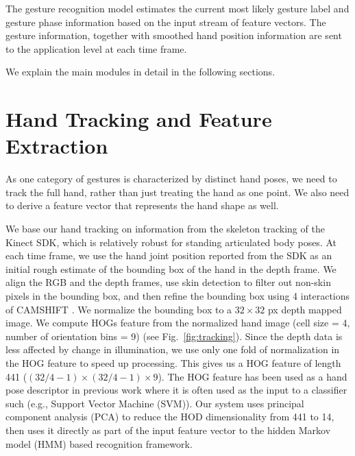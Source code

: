 \documentclass[conference]{IEEEtran}
\begin{document}
The gesture recognition model estimates the current most likely gesture label
and gesture phase information based on the input stream of
feature vectors. The gesture information, 
together with smoothed hand position information are sent to the application level at each time frame.

We explain the main modules in detail in the following sections.

\section{Hand Tracking and Feature Extraction}
As one category of gestures is characterized by distinct hand poses,
we need to track the full hand, rather than just treating the hand as one point. We
also need to derive a feature vector that represents the hand shape as well.

We base our hand tracking on information from the skeleton tracking of the
Kinect SDK, which is relatively robust for standing articulated body poses. At
each time frame, we use the hand joint position reported from the SDK as an
initial rough estimate of the bounding box of the hand in the depth frame.
We align the RGB and the depth frames, use skin detection to filter out
non-skin pixels in the bounding box, and then refine the bounding box using 4
interactions of CAMSHIFT \cite{bradski98}. We normalize the bounding box to a $32\times 32$ px depth
mapped image. We compute HOGs
feature from the normalized hand image (cell size =
4, number of orientation bins = 9) (see Fig.~\ref{fig:tracking}).
Since the depth data is less affected by change in illumination, we use only one
fold of normalization in the HOG feature to speed up processing.
This gives us a HOG feature of length 441 ($(32/4 - 1)\times (32/4 - 1)\times 9$). The HOG
feature has been used as a hand pose descriptor in previous work \cite{song12}
where it is often used as the input to a classifier such (e.g., Support Vector
Machine (SVM)). Our system uses principal component analysis (PCA)
to reduce the HOD dimensionality from 441 to 14, then uses it directly as part
of the input feature vector to the hidden Markov model (HMM) based recognition framework.
\end{document}

